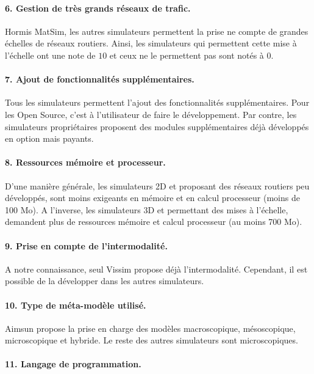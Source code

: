\paragraph{6. Gestion de très grands réseaux de trafic.} 

Hormis MatSim, les autres simulateurs permettent la prise ne compte de grandes échelles de réseaux routiers. Ainsi, les simulateurs qui permettent cette mise à l'échelle ont une note de $10$ et ceux ne le permettent pas sont notés à $0$.

\paragraph{7. Ajout de fonctionnalités supplémentaires.}

Tous les simulateurs permettent l'ajout des fonctionnalités supplémentaires. Pour les Open Source, c'est à l'utilisateur de faire le développement. Par contre, les simulateurs propriétaires proposent des modules supplémentaires déjà développés en option mais payants.  

\paragraph{8. Ressources mémoire et processeur.}
D'une manière générale, les simulateurs 2D et proposant des réseaux routiers peu développés, sont moins exigeants en mémoire et en calcul processeur (moins de 100 Mo). A l'inverse, les simulateurs 3D et permettant des mises à l'échelle, demandent plus de ressources mémoire et calcul processeur (au moins 700 Mo).

\paragraph{9. Prise en compte de l'intermodalité.}

A notre connaissance, seul Vissim propose déjà l'intermodalité. Cependant, il est possible de la \og développer \fg dans les autres simulateurs. 

\paragraph{10. Type de méta-modèle utilisé.}

Aimsun propose la prise en charge des modèles macroscopique, mésoscopique, microscopique et hybride. Le reste des autres simulateurs sont microscopiques. 

\paragraph{11. Langage de programmation.}

